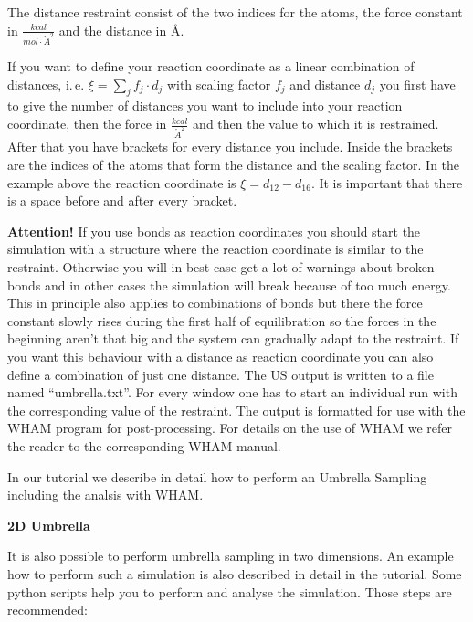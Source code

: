\documentclass[10pt,a4paper]{article} %
\begin{document}
	The distance restraint consist of the two indices for the atoms, the force constant in $\frac{kcal}{mol \cdot {\mathring{A}}^2}$ and the distance in \AA.

	
	If you want to define your reaction coordinate as a linear combination of distances, i.\,e. $\xi = \sum_j f_j \cdot d_j$ with scaling factor $f_j$ and distance $d_j$ you first have to give the number of distances you want to include into your reaction coordinate, then the force in $\frac{kcal}{{\mathring{A}}^2}$ and then the value to which it is restrained. After that you have brackets for every distance you include. Inside the brackets are the indices of the atoms that form the distance and the scaling factor. In the example above the reaction coordinate is $\xi = d_{12} - d_{16}$. It is important that there is a space before and after every bracket.
	
	\textbf{Attention!} If you use bonds as reaction coordinates you should start the simulation with a structure where the reaction coordinate is similar to the restraint. Otherwise you will in best case get a lot of warnings about broken bonds and in other cases the simulation will break because of too much energy. This in principle also applies to combinations of bonds but there the force constant slowly rises during the first half of equilibration so the forces in the beginning aren't that big and the system can gradually adapt to the restraint. If you want this behaviour with a distance as reaction coordinate you can also define a combination of just one distance.
	The \acl{US} output is written to a file named ``umbrella.txt''. For every window one has to start an individual run with the corresponding value of the restraint. The output is formatted for use with the \ac{WHAM} program\supercite{wham1, wham2} for post-processing. For details on the use of WHAM we refer the reader to the corresponding \ac{WHAM} manual.
	
	In our tutorial we describe in detail how to perform an Umbrella Sampling including the analsis with WHAM.
	
	\textbf{2D Umbrella}
	
	It is also possible to perform umbrella sampling in two dimensions. An example how to perform such a simulation is also described in detail in the tutorial. Some python scripts help you to perform and analyse the simulation. Those steps are recommended:
	
\end{document}

